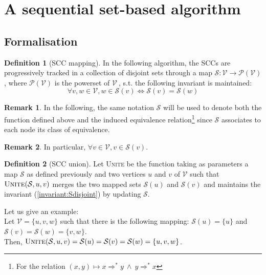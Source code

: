 \documentclass[a4 paper, 12pt]{article}
\theoremstyle{definition}
\def\VV{$\mathcal{V}~$}
\newtheorem{definition}{Definition}
\newtheorem{remark}{Remark}
\begin{document}
\pagebreak

\section{A sequential set-based algorithm}
\subsection{Formalisation}
\begin{definition}[SCC mapping]
    In the following algorithm, the SCCs are progressively tracked in a collection of disjoint sets through a map $\mathcal{S} : \mathcal{V} \longrightarrow \mathcal{P}(\mathcal{V})$, where $\mathcal{P}(\mathcal{V})$ is the powerset of \VV, s.t. the following invariant is maintained:
    \begin{equation}\label{invariant:Sdisjoint}
        \forall v, w \in \mathcal{V}, w\in \mathcal{S}(v) \Longleftrightarrow \mathcal{S}(v) = \mathcal{S}(w)
    \end{equation}
\end{definition}

\begin{remark}
    In the following, the same notation $\mathcal{S}$ will be used to denote both the function defined above and the induced equivalence relation\footnote{For the relation $(x, y) \mapsto x \Rightarrow^* y ~\land~ y \Rightarrow^* x $} since $\mathcal{S}$ associates to each node its class of equivalence.
\end{remark}

\begin{remark}
    In particular, $\forall v \in \mathcal{V}, v \in \mathcal{S}(v)$.
\end{remark}

\begin{definition}[SCC union]
    Let \textsc{Unite} be the function taking as parameters a map $\mathcal{S}$ as defined previously and two vertices $u$ and $v$ of $\mathcal{V}$ such that $\textsc{Unite}(\mathcal{S}, u, v)$ merges the two mapped sets $\mathcal{S}(u)$ and $\mathcal{S}(v)$ and maintains the invariant (\ref{invariant:Sdisjoint}) by updating $\mathcal{S}$.
\end{definition}
Let us give an example:\\
Let $\mathcal{V} = \{u,v,w\}$ such that there is the following mapping: $\mathcal{S}(u) = \{u\}$ and $\mathcal{S}(v) = \mathcal{S}(w) = \{v,w\}$.\\
Then, $\textsc{Unite}(\mathcal{S}, u, v) = \mathcal{S}(u) = \mathcal{S}(v) = \mathcal{S}(w) = \{u,v,w\}$.
\end{document}
